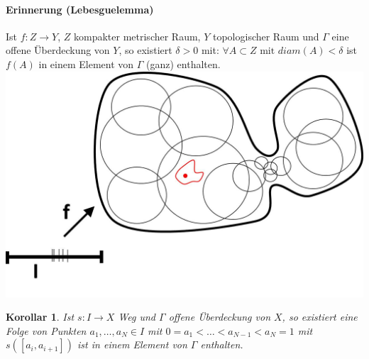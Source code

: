 \documentclass[a4paper,11pt,notitlepage]{report}
\newtheorem{corollary}{Korollar}[chapter]
\theoremstyle{remark}
\theoremstyle{definition}
\begin{document}
\paragraph{Erinnerung (Lebesguelemma)}
Ist $f \colon Z \rightarrow Y$, $Z$ kompakter metrischer Raum, $Y$ topologischer Raum und $\Gamma$ eine offene Überdeckung von $Y$, so existiert $\delta > 0$ mit: \newline  $\forall A \subset Z \text{ mit } diam(A) < \delta$ ist $f(A)$ in einem Element von $\Gamma$ (ganz) enthalten. \newline \includegraphics[scale=0.4]{images/Lebesguelemma.jpg}

\begin{corollary}{}
	Ist $s \colon I \rightarrow X$ Weg und $\Gamma$ offene Überdeckung von $X$, so existiert eine Folge von Punkten \newline $a_1, \ldots, a_N \in I$ mit $0 = a_1 < \ldots < a_{N-1} < a_N = 1$ mit \newline $s([a_i, a_{i+1}])$ ist in einem Element von $\Gamma$ enthalten.
\end{corollary}
\end{document}
